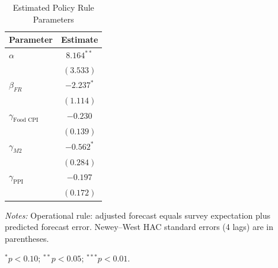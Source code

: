 \begin{table}[htbp]
\centering
\begin{threeparttable}
\caption{Estimated Policy Rule Parameters}
\label{tab:policy_rule_formula}
{\small
\begin{tabular}{lc}
\toprule
Parameter & Estimate \\
\midrule
$\alpha$ & $8.164^{**}$ \\
 & $(3.533)$ \\
$\beta_{FR}$ & $-2.237^{*}$ \\
 & $(1.114)$ \\
$\gamma_{\text{Food CPI}}$ & $-0.230$ \\
 & $(0.139)$ \\
$\gamma_{M2}$ & $-0.562^{*}$ \\
 & $(0.284)$ \\
$\gamma_{\text{PPI}}$ & $-0.197$ \\
 & $(0.172)$ \\
\bottomrule
\end{tabular}
}
\begin{tablenotes}[flushleft]
\footnotesize
\item \textit{Notes:} Operational rule: adjusted forecast equals survey expectation plus predicted forecast error. Newey--West HAC standard errors (4 lags) are in parentheses.
\item $^{*}p<0.10$; $^{**}p<0.05$; $^{***}p<0.01$.
\end{tablenotes}
\end{threeparttable}
\end{table}
